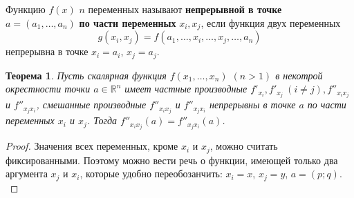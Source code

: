 \documentclass[12pt]{report}
\numberwithin{equation}{section}
\newtheorem{theorem}{Теорема}[section]
\begin{document}
Функцию $f(x)$ $n$ переменных называют \textbf{непрерывной в точке} $a = (a_1, \ldots, a_n)$ \textbf{по части переменных} $x_i, x_j$, если функция двух переменных
\[ g(x_i, x_j) = f(a_1, \ldots, x_i, \ldots, x_j, \ldots, a_n)\]
непрерывна в точке $x_i = a_i$, $x_j = a_j$.

\begin{theorem} \label{th:40:1}
Пусть скалярная функция $f(x_1, \ldots, x_n)$ $(n > 1)$ в некотрой окрестности точки $a \in \mathbb{R}^n$ имеет частные производные $f'_{x_i}, f'_{x_j}~(i \neq j), f''_{x_i x_j}$ и $f''_{x_j x_i}$, смешанные производные $f''_{x_i x_j}$ и $f''_{x_j x_i}$ непрерывны в точке $a$ по части переменных $x_i$ и $x_j$. Тогда $f''_{x_i x_j} (a) = f''_{x_j x_i}(a)$.
\end{theorem}
\begin{proof}
Значения всех переменных, кроме $x_i$ и $x_j$, можно считать фиксированными. Поэтому можно вести речь о функции, имеющей только два аргумента $x_j$ и $x_i$, которые удобно переобозанчить: $x_i = x$, $x_j = y$, $a = (p;q)$.\\


\end{proof}
\end{document}
